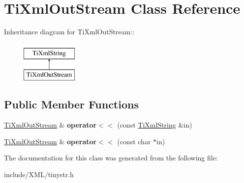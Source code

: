 \hypertarget{class_ti_xml_out_stream}{
\section{TiXmlOutStream Class Reference}
\label{class_ti_xml_out_stream}
}
Inheritance diagram for TiXmlOutStream::\begin{figure}[H]
\begin{center}
\leavevmode
\includegraphics[height=2cm]{class_ti_xml_out_stream}
\end{center}
\end{figure}
\subsection*{Public Member Functions}
\begin{DoxyCompactItemize}
\item 
\hypertarget{class_ti_xml_out_stream_a3640dcb1c0903be3bc6966cdc9a79db6}{
\hyperlink{class_ti_xml_out_stream}{TiXmlOutStream} \& {\bfseries operator$<$$<$} (const \hyperlink{class_ti_xml_string}{TiXmlString} \&in)}
\label{class_ti_xml_out_stream_a3640dcb1c0903be3bc6966cdc9a79db6}

\item 
\hypertarget{class_ti_xml_out_stream_af2117e5a8cbfcb69544804ad2859bfb6}{
\hyperlink{class_ti_xml_out_stream}{TiXmlOutStream} \& {\bfseries operator$<$$<$} (const char $\ast$in)}
\label{class_ti_xml_out_stream_af2117e5a8cbfcb69544804ad2859bfb6}

\end{DoxyCompactItemize}


The documentation for this class was generated from the following file:\begin{DoxyCompactItemize}
\item 
include/XML/tinystr.h\end{DoxyCompactItemize}
